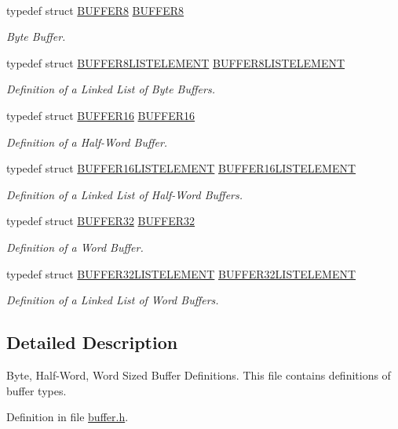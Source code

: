 \paragraph*{}
\begin{DoxyCompactItemize}
\item 
typedef struct \hyperlink{a00006}{BUFFER8} \hyperlink{a00654_gaa4fdb17d0c3544bbb3e8e9dabe0bb1f6}{BUFFER8}
\begin{DoxyCompactList}\small\item\em Byte Buffer. \end{DoxyCompactList}\item 
typedef struct \hyperlink{a00007}{BUFFER8LISTELEMENT} \hyperlink{a00654_ga908a8d75645fed38ef8093ab5674e461}{BUFFER8LISTELEMENT}
\begin{DoxyCompactList}\small\item\em Definition of a Linked List of Byte Buffers. \end{DoxyCompactList}\item 
typedef struct \hyperlink{a00002}{BUFFER16} \hyperlink{a00654_ga6ae39c7a97b24f77641192efbb669b38}{BUFFER16}
\begin{DoxyCompactList}\small\item\em Definition of a Half-\/Word Buffer. \end{DoxyCompactList}\item 
typedef struct \hyperlink{a00003}{BUFFER16LISTELEMENT} \hyperlink{a00654_gab4aef119192d21e626da2b0c12802f39}{BUFFER16LISTELEMENT}
\begin{DoxyCompactList}\small\item\em Definition of a Linked List of Half-\/Word Buffers. \end{DoxyCompactList}\item 
typedef struct \hyperlink{a00004}{BUFFER32} \hyperlink{a00654_ga5be842975bd489db6d6d6af54e8114fd}{BUFFER32}
\begin{DoxyCompactList}\small\item\em Definition of a Word Buffer. \end{DoxyCompactList}\item 
typedef struct \hyperlink{a00005}{BUFFER32LISTELEMENT} \hyperlink{a00654_ga9c77331cdbe545e46e5adaaf848b1170}{BUFFER32LISTELEMENT}
\begin{DoxyCompactList}\small\item\em Definition of a Linked List of Word Buffers. \end{DoxyCompactList}\end{DoxyCompactItemize}



\subsection{Detailed Description}
Byte, Half-\/Word, Word Sized Buffer Definitions. This file contains definitions of buffer types. 

Definition in file \hyperlink{a00465_source}{buffer.h}.

